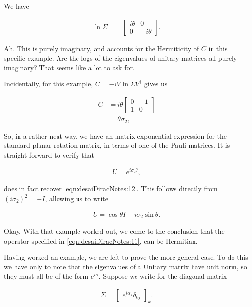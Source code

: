 We have

\begin{align*}
\ln \Sigma &=
\begin{bmatrix}
i\theta & 0 \\
0 & -i\theta 
\end{bmatrix}.
\end{align*}

Ah.  This is purely imaginary, and accounts for the Hermiticity of $C$ in this specific example.  Are the logs of the eigenvalues of unitary matrices all purely imaginary?  That seems like a lot to ask for.

Incidentally, for this example, $C = -i V \ln \Sigma V^\dagger$ gives us

\begin{align*}
C &= i \theta 
\begin{bmatrix}
0 & -1 \\
1 & 0
\end{bmatrix} \\
&= \theta \sigma_2,
\end{align*}

So, in a rather neat way, we have an matrix exponential expression for the standard planar rotation matrix, in terms of one of the Pauli matrices.  It is straight forward to verify that 

\begin{align}\label{eqn:desaiDiracNotes:13}
U = e^{i \sigma_2 \theta},
\end{align}

does in fact recover \ref{eqn:desaiDiracNotes:12}.  This follows directly from $(i \sigma_2)^2 = -I$, allowing us to write

\begin{align}\label{eqn:desaiDiracNotes:14}
U = \cos\theta I + i \sigma_2 \sin\theta.
\end{align}

Okay.  With that example worked out, we come to the conclusion that the operator specified in \ref{eqn:desaiDiracNotes:11}, can be Hermitian.

Having worked an example, we are left to prove the more general case.  To do this we have only to note that the eigenvalues of a Unitary matrix have unit norm, so they must all be of the form $e^{i\alpha}$.  Suppose we write for the diagonal matrix 

\begin{align}\label{eqn:desaiDiracNotes:11c}
\Sigma = 
{\begin{bmatrix}
e^{i\alpha_k} \delta_{kj}
\end{bmatrix}}_k.
\end{align}

